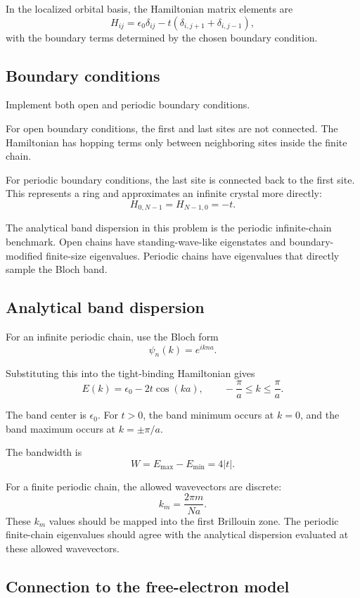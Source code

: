 In the localized orbital basis, the Hamiltonian matrix elements are
\[
H_{ij}
=
\epsilon_0\delta_{ij}
-
t
\left(
\delta_{i,j+1}
+
\delta_{i,j-1}
\right),
\]
with the boundary terms determined by the chosen boundary condition.

\subsection{Boundary conditions}

Implement both open and periodic boundary conditions.

For open boundary conditions, the first and last sites are not connected. The Hamiltonian has hopping terms only between neighboring sites inside the finite chain.

For periodic boundary conditions, the last site is connected back to the first site. This represents a ring and approximates an infinite crystal more directly:
\[
H_{0,N-1}=H_{N-1,0}=-t.
\]

The analytical band dispersion in this problem is the periodic infinite-chain benchmark. Open chains have standing-wave-like eigenstates and boundary-modified finite-size eigenvalues. Periodic chains have eigenvalues that directly sample the Bloch band.

\subsection{Analytical band dispersion}

For an infinite periodic chain, use the Bloch form
\[
\psi_n(k)=e^{ikna}.
\]

Substituting this into the tight-binding Hamiltonian gives
\[
E(k)=\epsilon_0-2t\cos(ka),
\qquad
-\frac{\pi}{a}\le k\le\frac{\pi}{a}.
\]

The band center is \(\epsilon_0\). For \(t>0\), the band minimum occurs at \(k=0\), and the band maximum occurs at \(k=\pm\pi/a\).

The bandwidth is
\[
W=E_{\max}-E_{\min}=4|t|.
\]

For a finite periodic chain, the allowed wavevectors are discrete:
\[
k_m=\frac{2\pi m}{Na}.
\]
These \(k_m\) values should be mapped into the first Brillouin zone. The periodic finite-chain eigenvalues should agree with the analytical dispersion evaluated at these allowed wavevectors.

\subsection{Connection to the free-electron model}

